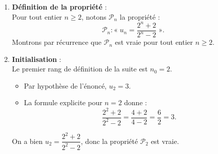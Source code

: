 \documentclass[11pt,a4paper]{article}
\begin{document}
\begin{correctionbox}
\begin{enumerate}[label=\textbf{\arabic*.}]
    \item \textbf{Définition de la propriété} :\\
    Pour tout entier $n \ge 2$, notons $\mathcal{P}_n$ la propriété :
    \[
    \mathcal{P}_n : « \; u_n = \frac{2^n + 2}{2^n - 2} \; ».
    \]
    Montrons par récurrence que $\mathcal{P}_n$ est vraie pour tout entier $n \ge 2$.

    \item \textbf{Initialisation} :\\
    Le premier rang de définition de la suite est $n_0 = 2$.
    \begin{itemize}
        \item Par hypothèse de l'énoncé, $u_2 = 3$.
        \item La formule explicite pour $n=2$ donne :
        \[
        \frac{2^2 + 2}{2^2 - 2} = \frac{4 + 2}{4 - 2} = \frac{6}{2} = 3.
        \]
    \end{itemize}
    On a bien $u_2 = \dfrac{2^2 + 2}{2^2 - 2}$, donc la propriété $\mathcal{P}_2$ est vraie.


\end{enumerate}
\end{correctionbox}
\end{document}
